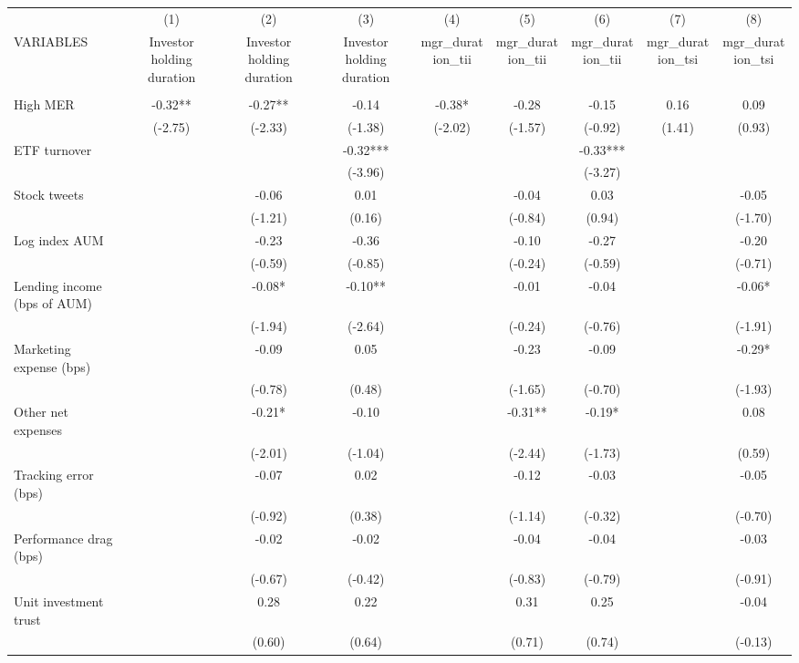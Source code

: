 \documentclass[]{article}
\begin{document}
\begin{tabular}{lcccccccc} \hline
 & (1) & (2) & (3) & (4) & (5) & (6) & (7) & (8) \\
VARIABLES & Investor holding duration & Investor holding duration & Investor holding duration & mgr\_duration\_tii & mgr\_duration\_tii & mgr\_duration\_tii & mgr\_duration\_tsi & mgr\_duration\_tsi \\ \hline
 &  &  &  &  &  &  &  &  \\
High MER & -0.32** & -0.27** & -0.14 & -0.38* & -0.28 & -0.15 & 0.16 & 0.09 \\
 & (-2.75) & (-2.33) & (-1.38) & (-2.02) & (-1.57) & (-0.92) & (1.41) & (0.93) \\
ETF turnover &  &  & -0.32*** &  &  & -0.33*** &  &  \\
 &  &  & (-3.96) &  &  & (-3.27) &  &  \\
Stock tweets &  & -0.06 & 0.01 &  & -0.04 & 0.03 &  & -0.05 \\
 &  & (-1.21) & (0.16) &  & (-0.84) & (0.94) &  & (-1.70) \\
Log index AUM &  & -0.23 & -0.36 &  & -0.10 & -0.27 &  & -0.20 \\
 &  & (-0.59) & (-0.85) &  & (-0.24) & (-0.59) &  & (-0.71) \\
Lending income (bps of AUM) &  & -0.08* & -0.10** &  & -0.01 & -0.04 &  & -0.06* \\
 &  & (-1.94) & (-2.64) &  & (-0.24) & (-0.76) &  & (-1.91) \\
Marketing expense (bps) &  & -0.09 & 0.05 &  & -0.23 & -0.09 &  & -0.29* \\
 &  & (-0.78) & (0.48) &  & (-1.65) & (-0.70) &  & (-1.93) \\
Other net expenses &  & -0.21* & -0.10 &  & -0.31** & -0.19* &  & 0.08 \\
 &  & (-2.01) & (-1.04) &  & (-2.44) & (-1.73) &  & (0.59) \\
Tracking error (bps) &  & -0.07 & 0.02 &  & -0.12 & -0.03 &  & -0.05 \\
 &  & (-0.92) & (0.38) &  & (-1.14) & (-0.32) &  & (-0.70) \\
Performance drag (bps) &  & -0.02 & -0.02 &  & -0.04 & -0.04 &  & -0.03 \\
 &  & (-0.67) & (-0.42) &  & (-0.83) & (-0.79) &  & (-0.91) \\
Unit investment trust &  & 0.28 & 0.22 &  & 0.31 & 0.25 &  & -0.04 \\
 &  & (0.60) & (0.64) &  & (0.71) & (0.74) &  & (-0.13) \\

\end{tabular}
\end{document}

